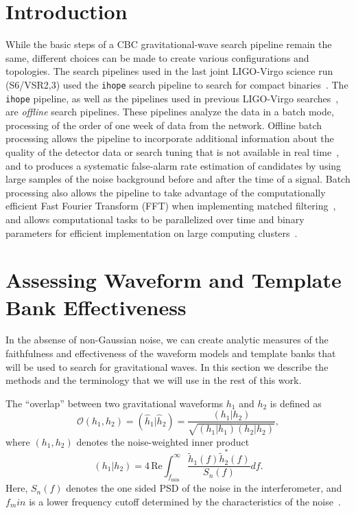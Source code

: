 \section{Introduction}

While the basic steps of a CBC gravitational-wave search pipeline remain the same, 
different choices can be made to
create various configurations and topologies. The search
pipelines used in the last joint LIGO-Virgo science run (S6/VSR2,3) used the
\texttt{ihope} search pipeline to search for compact
binaries~\cite{Babak:2012zx}. The \texttt{ihope} pipeline, as well as the
pipelines used in previous LIGO-Virgo
searches~\cite{Brown:2004pv,Brown:2005zs}, are \emph{offline} search
pipelines. These pipelines analyze the data in a batch mode, processing
of the order of one week of data from the network. Offline batch
processing allows the pipeline to incorporate additional information about the
quality of the detector data or search tuning that is not available in real
time~\cite{Aasi:2012wd,Aasi:2014mqd}, and to produces a systematic false-alarm rate
estimation of candidates by using large samples of the noise background before
and after the time of a signal. Batch processing also allows the pipeline to
take advantage of the computationally efficient Fast Fourier Transform (FFT)
when implementing matched filtering~\cite{Allen:2005fk}, and allows
computational tasks to be parallelized over time and binary parameters for
efficient implementation on large computing clusters~\cite{Brown:workflow}.

\section{Assessing Waveform and Template Bank Effectiveness}
\label{sec:analytic_vol}

In the absense of non-Gaussian noise, we can create analytic measures of the
faithfulness and effectiveness of the waveform models and template banks that 
will be used to search for gravitational waves. In this section we describe 
the methods and the terminology that we will use in the rest of this work.

The ``overlap'' between two gravitational waveforms $h_1$ and $h_2$ is defined as
%
\begin{equation}
 \mathcal{O}(h_1,h_2) = (\hat{h}_1|\hat{h}_2) =
\dfrac{(h_1|h_2)}{\sqrt{(h_1|h_1)(h_2|h_2)}},
\end{equation}
%
where $(h_1,h_2)$ denotes the noise-weighted inner product
%
\begin{equation}
(h_1|h_2) = 4 \, \mathrm{Re}
\int^{\infty}_{f_{\mathrm{min}}}\dfrac{\tilde{h}_1(f)\tilde{h}_2^*(f)}{S_n(f)} 
df.
\end{equation}
%
Here, $S_n(f)$ denotes the one sided \ac{PSD} of the noise in the
interferometer, and $f_min$ is a lower frequency cutoff determined by the
characteristics of the noise~\cite{Apostolatos:1995pj}.

